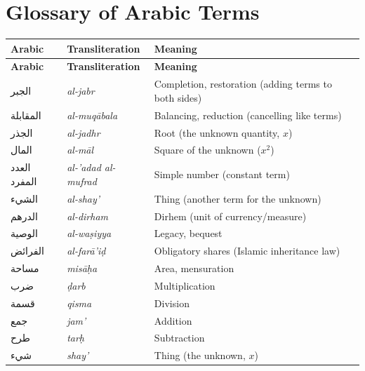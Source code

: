 \documentclass[11pt,a4paper,openany,oneside]{book}
\newcommand{\ar}[1]{{\arabicfont\beginR #1\endR}}
\begin{document}
\chapter{Glossary of Arabic Terms}
\label{app:glossary}

\begin{center}
\renewcommand{\arraystretch}{1.4}
\begin{longtable}{|l|l|l|}
\hline
\textbf{Arabic} & \textbf{Transliteration} & \textbf{Meaning} \\
\hline
\endfirsthead
\hline
\textbf{Arabic} & \textbf{Transliteration} & \textbf{Meaning} \\
\hline
\endhead
\hline
\endfoot
\ar{الجبر} & \textit{al-jabr} & Completion, restoration (adding terms to both sides) \\
\hline
\ar{المقابلة} & \textit{al-muq\=abala} & Balancing, reduction (cancelling like terms) \\
\hline
\ar{الجذر} & \textit{al-jadhr} & Root (the unknown quantity, $x$) \\
\hline
\ar{المال} & \textit{al-m\=al} & Square of the unknown ($x^2$) \\
\hline
\ar{العدد المفرد} & \textit{al-'adad al-mufrad} & Simple number (constant term) \\
\hline
\ar{الشيء} & \textit{al-shay'} & Thing (another term for the unknown) \\
\hline
\ar{الدرهم} & \textit{al-dirham} & Dirhem (unit of currency/measure) \\
\hline
\ar{الوصية} & \textit{al-wa\d{s}iyya} & Legacy, bequest \\
\hline
\ar{الفرائض} & \textit{al-far\=a'i\d{d}} & Obligatory shares (Islamic inheritance law) \\
\hline
\ar{مساحة} & \textit{mis\=a\d{h}a} & Area, mensuration \\
\hline
\ar{ضرب} & \textit{\d{d}arb} & Multiplication \\
\hline
\ar{قسمة} & \textit{qisma} & Division \\
\hline
\ar{جمع} & \textit{jam'} & Addition \\
\hline
\ar{طرح} & \textit{tar\d{h}} & Subtraction \\
\hline
\ar{شيء} & \textit{shay'} & Thing (the unknown, $x$) \\
\hline
\end{longtable}
\end{center}

\newpage

\end{document}
